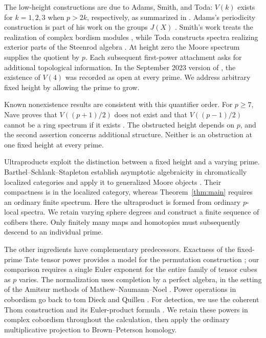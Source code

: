 The low-height constructions are due to Adams, Smith, and Toda:
$V(k)$ exists for $k=1,2,3$ when $p>2k$, respectively, as summarized
in \cite[p.~493]{Nave2010}. Adams's periodicity construction is
part of his work on the groups $J(X)$ \cite{Adams1966}.
Smith's work treats the realization
of complex bordism modules \cite{Smith1970}, while Toda constructs
spectra realizing exterior parts of the Steenrod algebra
\cite{Toda1971}. At height zero the Moore spectrum supplies the
quotient by $p$. Each subsequent first-power attachment asks for
additional topological information. In the September 2023 version of
\cite[Remark~3.29]{CulverZhang2024}, the existence of $V(4)$ was
recorded as open at every prime. We address arbitrary fixed height
by allowing the prime to grow.

Known nonexistence results are consistent with this quantifier order.
For $p\geq7$, Nave proves that $V((p+1)/2)$ does not exist and that
$V((p-1)/2)$ cannot be a ring spectrum if it exists
\cite[Theorem~1.3]{Nave2010}. The obstructed height depends on $p$,
and the second assertion concerns additional structure. Neither is an
obstruction at one fixed height at every prime.

Ultraproducts exploit the distinction between a fixed height and a
varying prime. Barthel--Schlank--Stapleton establish asymptotic
algebraicity in chromatically localized categories and apply it to
generalized Moore objects \cite{BSS2020}. Their compactness is in
the localized category, whereas Theorem~\ref{thm:main} requires
an ordinary finite spectrum. Here the ultraproduct is formed from
ordinary $p$-local spectra. We retain varying sphere degrees and
construct a finite sequence of cofibers there. Only finitely many
maps and homotopies must subsequently descend to an individual
prime.

The other ingredients have complementary predecessors. Exactness
of the fixed-prime Tate tensor power provides a model for the
permutation construction \cite[Proposition~III.1.1]{NS2018}; our
comparison requires a single Euler exponent for the entire family
of tensor cubes as $p$ varies. The normalization uses completion
by a perfect algebra, in the setting of the Amitsur methods of
Mathew--Naumann--Noel \cite{MNN2017}. Power operations in cobordism
go back to tom Dieck and Quillen \cite{tomDieck1968,Quillen1971}.
For detection, we use the coherent Thom construction and its
Euler-product formula \cite{May1977,JohnsonNoel2010}. We retain these powers in complex
cobordism throughout the calculation, then apply the ordinary
multiplicative projection to Brown--Peterson homology.

